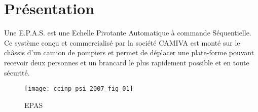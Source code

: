 \section{Présentation}

Une E.P.A.S. est une Echelle Pivotante Automatique à commande Séquentielle. Ce système conçu et commercialisé par la société CAMIVA est monté sur le châssis d’un camion de pompiers et permet de déplacer une plate-forme pouvant recevoir deux personnes et un brancard le plus rapidement possible et en toute sécurité.


\begin{figure}[H]
\centering
\texttt{[image: ccinp\_psi\_2007\_fig\_01]}
\caption{\label{ccinp_psi_2007_fig_01} EPAS}
\end{figure}